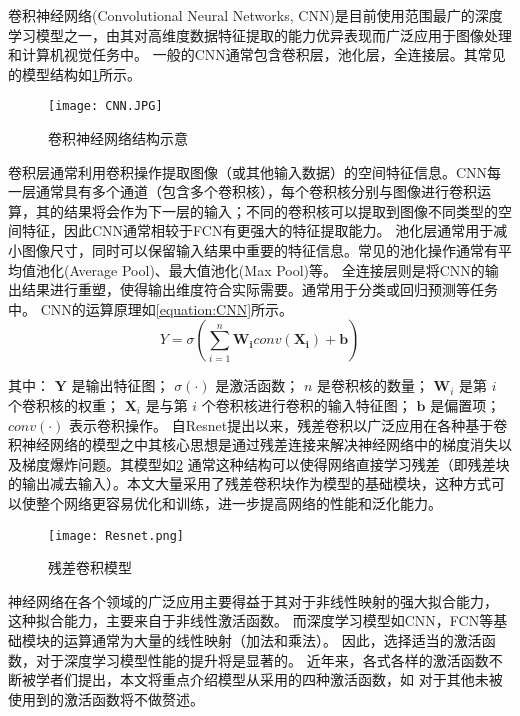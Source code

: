卷积神经网络(Convolutional Neural Networks, CNN)是目前使用范围最广的深度学习模型之一，由其对高维度数据特征提取的能力优异表现而广泛应用于图像处理和计算机视觉任务中。
一般的CNN通常包含卷积层，池化层，全连接层。其常见的模型结构如\cref{figure:CNN}所示。

\begin{figure}[h]
  \centering
\texttt{[image: CNN.JPG]}
\caption{卷积神经网络结构示意}
\label{figure:CNN}
\end{figure}

卷积层通常利用卷积操作提取图像（或其他输入数据）的空间特征信息。CNN每一层通常具有多个通道（包含多个卷积核），每个卷积核分别与图像进行卷积运算，其的结果将会作为下一层的输入；不同的卷积核可以提取到图像不同类型的空间特征，因此CNN通常相较于FCN有更强大的特征提取能力。
池化层通常用于减小图像尺寸，同时可以保留输入结果中重要的特征信息。常见的池化操作通常有平均值池化(Average Pool)、最大值池化(Max Pool)等。
全连接层则是将CNN的输出结果进行重塑，使得输出维度符合实际需要。通常用于分类或回归预测等任务中。
CNN的运算原理如\cref{equation:CNN}所示。
\begin{equation}
  \label{equation:CNN}
  Y = \sigma\left(\sum_{i=1}^{n} \boldsymbol{W_i} conv(\boldsymbol{X_i}) + \boldsymbol{b}\right)
\end{equation}

其中：
$\mathbf{Y}$ 是输出特征图；
$\sigma(\cdot)$ 是激活函数；
$n$ 是卷积核的数量；
$\mathbf{W}_i$ 是第 $i$ 个卷积核的权重；
$\mathbf{X}_i$ 是与第 $i$ 个卷积核进行卷积的输入特征图；
$\mathbf{b}$ 是偏置项；
$conv(\cdot)$ 表示卷积操作。
自Resnet提出以来\cite{2016Resnet}，残差卷积以广泛应用在各种基于卷积神经网络的模型之中其核心思想是通过残差连接来解决神经网络中的梯度消失以及梯度爆炸问题。其模型如\cref{figure:Resnet}
通常这种结构可以使得网络直接学习残差（即残差块的输出减去输入）。本文大量采用了残差卷积块作为模型的基础模块，这种方式可以使整个网络更容易优化和训练，进一步提高网络的性能和泛化能力。
\begin{figure}[h]
  \centering
  \texttt{[image: Resnet.png]}
  \caption{残差卷积模型}
  \label{figure:Resnet}
\end{figure}




神经网络在各个领域的广泛应用主要得益于其对于非线性映射的强大拟合能力，
这种拟合能力，主要来自于非线性激活函数。
而深度学习模型如CNN，FCN等基础模块的运算通常为大量的线性映射（加法和乘法）。
因此，选择适当的激活函数，对于深度学习模型性能的提升将是显著的。
近年来，各式各样的激活函数不断被学者们提出，本文将重点介绍模型从采用的四种激活函数，如
对于其他未被使用到的激活函数将不做赘述。


